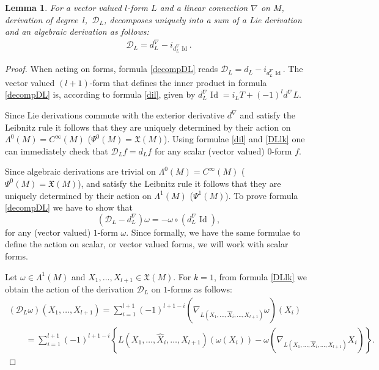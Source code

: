 \documentclass[11pt]{article}
\numberwithin{equation}{section}
\newtheorem{Lemma}[Theorem]{Lemma}
\begin{document}
\begin{Lemma} \label{lem:dec_DL} For a vector valued $l$-form $L$ and a linear connection $\nabla$ on $M$,
derivation of degree~$l$,~${\mathcal D}_L$, decomposes uniquely
into a sum of a Lie derivation and an algebraic derivation
as follows:
\begin{gather}
{\mathcal D}_L= d^{\nabla}_L -
i_{d^{\nabla}_L\operatorname{Id}}.\label{decompDL}
\end{gather}
\end{Lemma}
\begin{proof}
When acting on forms, formula \eqref{decompDL} reads ${\mathcal
D}_L= d_L - i_{d^{\nabla}_L\operatorname{Id}}$. The vector valued
$(l+1)$-form that def\/ines the inner product in formula
\eqref{decompDL} is, according to formula \eqref{dil}, given by
$d^{\nabla}_L\operatorname{Id}=i_LT +(-1)^ld^{\nabla}L.$

Since Lie derivations commute with the exterior
derivative $d^{\nabla}$ and satisfy the Leibnitz rule it follows that
they are uniquely determined by their action on
$\Lambda^0(M)=C^{\infty}(M)$ ($\Psi^0(M)={\mathfrak X}(M)$).
Using formulae \eqref{dil} and \eqref{DLlk} one can immediately
check that ${\mathcal D}_Lf=d_Lf$ for any scalar (vector
valued) $0$-form $f$.

Since algebraic derivations are trivial on
$\Lambda^0(M)=C^{\infty}(M)$ ($\Psi^0(M)={\mathfrak X}(M)$), and
satisfy the Leibnitz rule it follows that they are uniquely determined by
their action on $\Lambda^1(M)$ ($\Psi^1(M)$). To prove formula
\eqref{decompDL} we have to show that
\[
\left({\mathcal D}_L- d^{\nabla}_L\right)\omega = -\omega \circ
\left(d^{\nabla}_L\operatorname{Id}\right),
\]
 for any (vector valued) $1$-form
$\omega$. Since formally, we have the same formulae to def\/ine the
action on scalar, or vector valued forms, we will work with scalar
forms.

Let $\omega \in \Lambda^1(M)$ and $X_1, \dots , X_{l+1} \in
{\mathfrak X}(M)$. For $k=1$, from formula \eqref{DLlk} we obtain
the action of the derivation ${\mathcal D}_L$ on $1$-forms as
follows:
\begin{gather}
 \left({\mathcal D}_L\omega\right)(X_1,\dots , X_{l+1})=
\sum_{i=1}^{l+1}(-1)^{l+1-i}\left(\nabla_{L(X_1,\dots ,
\hat{X}_i,\dots ,X_{l+1})}\omega\right)(X_i) \nonumber  \\
\qquad{}
=  \sum_{i=1}^{l+1}(-1)^{l+1-i} \left\{L(X_1,\dots , \hat{X}_i,\dots ,X_{l+1})
(\omega(X_i)) -\omega\left( \nabla_{L(X_1,\dots ,
\hat{X}_i,\dots ,X_{l+1})} X_i\right)\right\}. \!\!\!\label{eq:dlo1}
\end{gather}


\end{proof}
\end{document}
